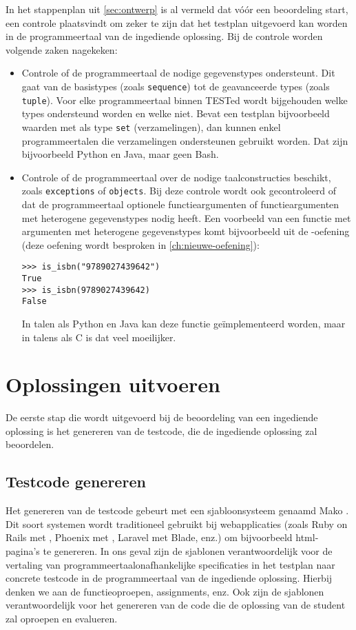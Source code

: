 In het stappenplan uit \cref{sec:ontwerp} is al vermeld dat vóór een beoordeling start, een controle plaatsvindt om zeker te zijn dat het testplan uitgevoerd kan worden in de programmeertaal van de ingediende oplossing.
Bij de controle worden volgende zaken nagekeken:
\begin{itemize}
    \item Controle of de programmeertaal de nodige gegevenstypes ondersteunt.
    Dit gaat van de basistypes (zoals \texttt{sequence}) tot de geavanceerde types (zoals \texttt{tuple}).
    Voor elke programmeertaal binnen TESTed wordt bijgehouden welke types ondersteund worden en welke niet.
    Bevat een testplan bijvoorbeeld waarden met als type \texttt{set} (verzamelingen), dan kunnen enkel programmeertalen die verzamelingen ondersteunen gebruikt worden.
    Dat zijn bijvoorbeeld Python en Java, maar geen Bash.
    \item Controle of de programmeertaal over de nodige taalconstructies beschikt, zoals \texttt{exceptions} of \texttt{objects}.
    Bij deze controle wordt ook gecontroleerd of dat de programmeertaal optionele functieargumenten of functieargumenten met heterogene gegevenstypes nodig heeft.
    Een voorbeeld van een functie met argumenten met heterogene gegevenstypes komt bijvoorbeeld uit de -oefening (deze oefening wordt besproken in \cref{ch:nieuwe-oefening}):
    \begin{verbatim}
>>> is_isbn("9789027439642")
True
>>> is_isbn(9789027439642)
False
    \end{verbatim}
    In talen als Python en Java kan deze functie geïmplementeerd worden, maar in talens als C is dat veel moeilijker.
\end{itemize}

\section{Oplossingen uitvoeren}\label{sec:oplossingen-uitvoeren}

De eerste stap die wordt uitgevoerd bij de beoordeling van een ingediende oplossing is het genereren van de testcode, die de ingediende oplossing zal beoordelen.

\subsection{Testcode genereren}\label{subsec:testcode-genereren}

Het genereren van de testcode gebeurt met een sjabloonsysteem genaamd Mako \autocite{mako}.
Dit soort systemen wordt traditioneel gebruikt bij webapplicaties (zoals Ruby on Rails met , Phoenix met , Laravel met Blade, enz.) om bijvoorbeeld html-pagina's te genereren.
In ons geval zijn de sjablonen verantwoordelijk voor de vertaling van programmeertaalonafhankelijke specificaties in het testplan naar concrete testcode in de programmeertaal van de ingediende oplossing.
Hierbij denken we aan de functieoproepen, assignments, enz.
Ook zijn de sjablonen verantwoordelijk voor het genereren van de code die de oplossing van de student zal oproepen en evalueren.

